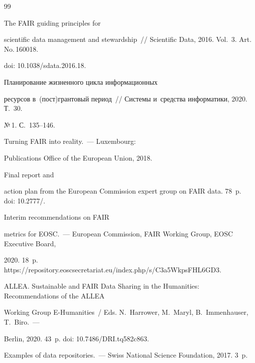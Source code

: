 {\small\frenchspacing

{%


\begin{thebibliography}{99}


 The FAIR guiding principles for 

scientific data management and stewardship~/\!\!/ Scientific Data, 2016. Vol.~3. Art. No.\,160018. 

doi: 10.1038/sdata.2016.18. 


 Планирование жизненного цикла информационных 

ресурсов в~(пост)грантовый период~/\!\!/ Системы и~средства информатики, 2020. Т.~30. 

№\,1. С.~135--146.


 Turning FAIR into reality.~--- Luxembourg: 

Publications Office of the European Union, 2018. 

Final report and 

action plan from the European Commission expert group on FAIR data. 78~p. doi: 10.2777\!/.


 Interim recommendations on FAIR 

metrics for EOSC.~--- European Commission, FAIR Working Group, EOSC Executive Board, 

2020. 18~p. {\sf https://repository.eoscsecretariat.eu/index.php/s/C3a5WkpsFHL6GD3}.


ALLEA. Sustainable and FAIR Data Sharing in the Humanities: Recommendations of the ALLEA 

Working Group E-Humanities~/ Eds. N.~Harrower, M.~Maryl, B.~Immenhauser, T.~Biro.~--- 

Berlin, 2020. 43~p. doi: 10.7486\!/\!DRI.tq582c863.


Examples of data repositories.~--- Swiss National Science Foundation, 2017. 3~p. {\sf 

}
\end{thebibliography}}}
